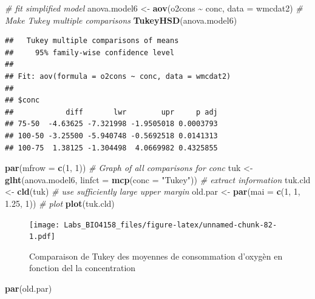\documentclass[
  12pt,
]{book}
\newenvironment{Shaded}{\begin{snugshade}}{\end{snugshade}}
\newcommand{\CommentTok}[1]{\textcolor[rgb]{0.56,0.35,0.01}{\textit{#1}}}
\newcommand{\DataTypeTok}[1]{\textcolor[rgb]{0.13,0.29,0.53}{#1}}
\newcommand{\DecValTok}[1]{\textcolor[rgb]{0.00,0.00,0.81}{#1}}
\newcommand{\FloatTok}[1]{\textcolor[rgb]{0.00,0.00,0.81}{#1}}
\newcommand{\KeywordTok}[1]{\textcolor[rgb]{0.13,0.29,0.53}{\textbf{#1}}}
\newcommand{\NormalTok}[1]{#1}
\newcommand{\OperatorTok}[1]{\textcolor[rgb]{0.81,0.36,0.00}{\textbf{#1}}}
\newcommand{\StringTok}[1]{\textcolor[rgb]{0.31,0.60,0.02}{#1}}
\begin{document}
\begin{Shaded}
\begin{Highlighting}[]
\CommentTok{\# fit simplified model}
\NormalTok{anova.model6 \textless{}{-}}\StringTok{ }\KeywordTok{aov}\NormalTok{(o2cons }\OperatorTok{\textasciitilde{}}\StringTok{ }\NormalTok{conc, }\DataTypeTok{data =}\NormalTok{ wmcdat2)}
\CommentTok{\# Make Tukey multiple comparisons}
\KeywordTok{TukeyHSD}\NormalTok{(anova.model6)}
\end{Highlighting}
\end{Shaded}

\begin{verbatim}
##   Tukey multiple comparisons of means
##     95% family-wise confidence level
## 
## Fit: aov(formula = o2cons ~ conc, data = wmcdat2)
## 
## $conc
##            diff       lwr        upr     p adj
## 75-50  -4.63625 -7.321998 -1.9505018 0.0003793
## 100-50 -3.25500 -5.940748 -0.5692518 0.0141313
## 100-75  1.38125 -1.304498  4.0669982 0.4325855
\end{verbatim}

\begin{Shaded}
\begin{Highlighting}[]
\KeywordTok{par}\NormalTok{(}\DataTypeTok{mfrow =} \KeywordTok{c}\NormalTok{(}\DecValTok{1}\NormalTok{, }\DecValTok{1}\NormalTok{))}
\CommentTok{\# Graph of all comparisons for conc}
\NormalTok{tuk \textless{}{-}}\StringTok{ }\KeywordTok{glht}\NormalTok{(anova.model6, }\DataTypeTok{linfct =} \KeywordTok{mcp}\NormalTok{(}\DataTypeTok{conc =} \StringTok{"Tukey"}\NormalTok{))}
\CommentTok{\# extract information}
\NormalTok{tuk.cld \textless{}{-}}\StringTok{ }\KeywordTok{cld}\NormalTok{(tuk)}
\CommentTok{\# use sufficiently large upper margin}
\NormalTok{old.par \textless{}{-}}\StringTok{ }\KeywordTok{par}\NormalTok{(}\DataTypeTok{mai =} \KeywordTok{c}\NormalTok{(}\DecValTok{1}\NormalTok{, }\DecValTok{1}\NormalTok{, }\FloatTok{1.25}\NormalTok{, }\DecValTok{1}\NormalTok{))}
\CommentTok{\# plot}
\KeywordTok{plot}\NormalTok{(tuk.cld)}
\end{Highlighting}
\end{Shaded}

\begin{figure}
\centering
\texttt{[image: Labs\_BIO4158\_files/figure-latex/unnamed-chunk-82-1.pdf]}
\caption{\label{fig:unnamed-chunk-82}Comparaison de Tukey des moyennes de consommation d'oxygèn en fonction del la concentration}
\end{figure}

\begin{Shaded}
\begin{Highlighting}[]
\KeywordTok{par}\NormalTok{(old.par)}
\end{Highlighting}
\end{Shaded}
\end{document}
